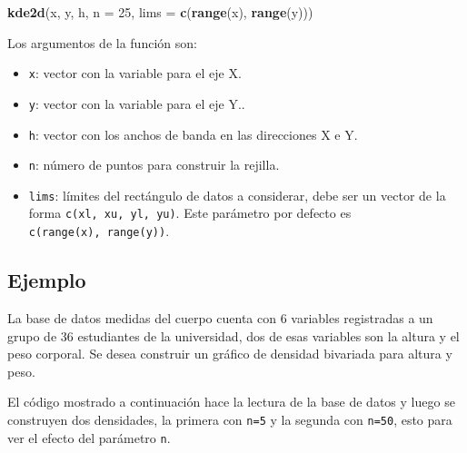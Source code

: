 \documentclass[10pt,]{krantz}
\makeatletter
\newenvironment{Shaded}{\begin{snugshade}}{\end{snugshade}}
\newcommand{\KeywordTok}[1]{\textcolor[rgb]{0.13,0.29,0.53}{\textbf{#1}}}
\newcommand{\DataTypeTok}[1]{\textcolor[rgb]{0.13,0.29,0.53}{#1}}
\newcommand{\DecValTok}[1]{\textcolor[rgb]{0.00,0.00,0.81}{#1}}
\newcommand{\StringTok}[1]{\textcolor[rgb]{0.31,0.60,0.02}{#1}}
\newcommand{\CommentTok}[1]{\textcolor[rgb]{0.56,0.35,0.01}{\textit{#1}}}
\newcommand{\OperatorTok}[1]{\textcolor[rgb]{0.81,0.36,0.00}{\textbf{#1}}}
\newcommand{\NormalTok}[1]{#1}
\providecommand{\tightlist}{%
  \setlength{\itemsep}{0pt}\setlength{\parskip}{0pt}}
\newenvironment{kframe}{%
\medskip{}
\setlength{\fboxsep}{.8em}
 \def\at@end@of@kframe{}%
 \ifinner\ifhmode%
  \def\at@end@of@kframe{\end{minipage}}%
  \begin{minipage}{\columnwidth}%
 \fi\fi%
 \def\FrameCommand##1{\hskip\@totalleftmargin \hskip-\fboxsep
 \colorbox{shadecolor}{##1}\hskip-\fboxsep
     \hskip-\linewidth \hskip-\@totalleftmargin \hskip\columnwidth}%
 \MakeFramed {\advance\hsize-\width
   \@totalleftmargin\z@ \linewidth\hsize
   \@setminipage}}%
 {\par\unskip\endMakeFramed%
 \at@end@of@kframe}
\renewenvironment{Shaded}{\begin{kframe}}{\end{kframe}}
\makeatother
\begin{document}
\begin{Shaded}
\begin{Highlighting}[]
\KeywordTok{kde2d}\NormalTok{(x, y, h, }\DataTypeTok{n =} \DecValTok{25}\NormalTok{, }\DataTypeTok{lims =} \KeywordTok{c}\NormalTok{(}\KeywordTok{range}\NormalTok{(x), }\KeywordTok{range}\NormalTok{(y)))}
\end{Highlighting}
\end{Shaded}

Los argumentos de la función son:

\begin{itemize}
\tightlist
\item
  \texttt{x}: vector con la variable para el eje X.
\item
  \texttt{y}: vector con la variable para el eje Y..
\item
  \texttt{h}: vector con los anchos de banda en las direcciones X e Y.
\item
  \texttt{n}: número de puntos para construir la rejilla.
\item
  \texttt{lims}: límites del rectángulo de datos a considerar, debe ser
  un vector de la forma \texttt{c(xl,\ xu,\ yl,\ yu)}. Este parámetro
  por defecto es \texttt{c(range(x),\ range(y))}.
\end{itemize}

\subsection*{Ejemplo}\label{ejemplo-25}


La base de datos medidas del cuerpo cuenta con 6 variables registradas a
un grupo de 36 estudiantes de la universidad, dos de esas variables son
la altura y el peso corporal. Se desea construir un gráfico de densidad
bivariada para altura y peso.

El código mostrado a continuación hace la lectura de la base de datos y
luego se construyen dos densidades, la primera con \texttt{n=5} y la
segunda con \texttt{n=50}, esto para ver el efecto del parámetro
\texttt{n}.

\begin{Shaded}
\end{Shaded}
\end{document}
